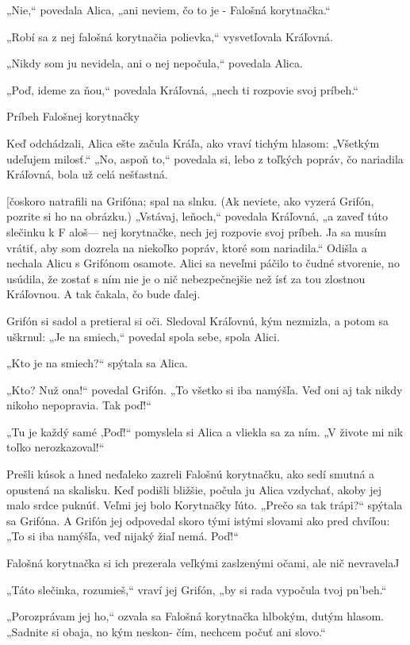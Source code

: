 \documentclass[12pt]{article}
\begin{document}
\begin{Parallel}[p]{}{}
{{„Nie,“ povedala Alica, „ani neviem, čo to je - Falošná
korytnačka.“

„Robí sa z nej falošná korytnačia polievka,“ vysvetľovala
Kráľovná.

„Nikdy som ju nevidela, ani o nej nepočula,“ povedala
Alica.

„Poď, ideme za ňou,“ povedala Kráľovná, „nech ti
rozpovie svoj príbeh.“

 

Príbeh Falošnej korytnačky

Keď odchádzali, Alica ešte začula Kráľa, ako vraví tichým
hlasom: „Všetkým udeľujem milosť.“ „No, aspoň to,“
povedala si, lebo z toľkých popráv, čo nariadila Kráľovná,
bola už celá nešťastná.

[čoskoro natrafili na Grifóna; spal na slnku. (Ak neviete,
ako vyzerá Grifón, pozrite si ho na obrázku.) „Vstávaj,
leňoch,“ povedala Kráľovná, „a zaveď túto slečinku k F aloš—
nej korytnačke, nech jej rozpovie svoj príbeh. Ja sa musím
vrátiť, aby som dozrela na niekoľko popráv, ktoré som
nariadila.“ Odišla a nechala Alicu s Grifónom osamote.
Alici sa neveľmi páčilo to čudné stvorenie, no usúdila, že
zostať s ním nie je o nič nebezpečnejšie než ísť za tou
zlostnou Kráľovnou. A tak čakala, čo bude ďalej.

Grifón si sadol a pretieral si oči. Sledoval Kráľovnú, kým
nezmizla, a potom sa uškrnul: „Je na smiech,“ povedal
spola sebe, spola Alici.

„Kto je na smiech?“ spýtala sa Alica.

„Kto? Nuž ona!“ povedal Grifón. „To všetko si iba
namýšľa. Veď oni aj tak nikdy nikoho nepopravia. Tak
poď!“

„Tu je každý samé ,Poď!“ pomyslela si Alica a vliekla sa
za ním. „V živote mi nik toľko nerozkazoval!“

Prešli kúsok a hned neďaleko zazreli Falošnú korytnačku,
ako sedí smutná a opustená na skalisku. Keď podišli bližšie,
počula ju Alica vzdychať, akoby jej malo srdce puknúť.
Veľmi jej bolo Korytnačky ľúto. „Prečo sa tak trápi?“
spýtala sa Grifóna. A Grifón jej odpovedal skoro tými istými
slovami ako pred chvíľou: „To si iba namýšľa, veď nijaký
žiaľ nemá. Poď!“

Falošná korytnačka si ich prezerala veľkými zaslzenými
očami, ale nič nevravelaJ

„Táto slečinka, rozumieš,“ vraví jej Grifón, „by si rada
vypočula tvoj pn'beh.“

„Porozprávam jej ho,“ ozvala sa Falošná korytnačka
hlbokým, dutým hlasom. „Sadnite si obaja, no kým neskon-
čím, nechcem počuť ani slovo.“

}}
\end{Parallel}
\end{document}
